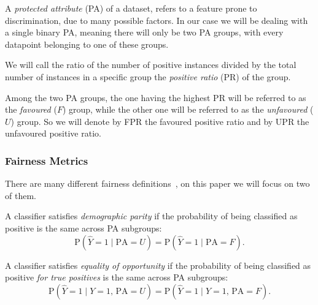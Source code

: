 \documentclass[runningheads]{llncs}
\begin{document}
\begin{definition}
  A \emph{protected attribute} \textup{(}PA\textup{)} of a dataset, refers to a feature prone to discrimination, due to many possible factors. In our case we will be dealing with a single binary PA, meaning there will only be two PA groups, with every datapoint belonging to one of these groups.
\end{definition}

\begin{definition}
  We will call the ratio of the number of positive instances divided by the total number of instances in a specific group the \emph{positive ratio} \textup{(}PR\textup{)} of the group. 
\end{definition}

\begin{definition}
  Among the two PA groups, the one having the highest PR will be referred to as the \emph{favoured} \textup{(}$F$\textup{)} group, while the other one will be referred to as the \emph{unfavoured} \textup{(}$U$\textup{)} group. So we will denote by FPR the favoured positive ratio and by UPR the unfavoured positive ratio.
\end{definition}

\subsubsection{Fairness Metrics}

There are many different fairness definitions~\cite{kusner2017counterfactual,kilbertus2017avoiding}, on this paper we will focus on two of them.

\begin{definition}
  A classifier satisfies \emph{demographic parity} if the probability of being classified as positive is the same across PA subgroups:
  \begin{equation}
    \label{eq:dp}
    \text{P} \left( \hat{Y} = 1 \mid \text{PA} = U \right) =
    \text{P} \left( \hat{Y} = 1 \mid \text{PA} = F \right).
  \end{equation}
\end{definition}

\begin{definition}
  A classifier satisfies \emph{equality of opportunity} if the probability of being classified as positive \emph{for true positives} is the same across PA subgroups:
  \begin{equation}
    \label{eq:eo}
    \text{P} \left( \hat{Y} = 1 \mid Y = 1,\, \text{PA} = U \right) =
    \text{P} \left( \hat{Y} = 1 \mid Y = 1,\, \text{PA} = F \right).
  \end{equation}
\end{definition}
\end{document}
